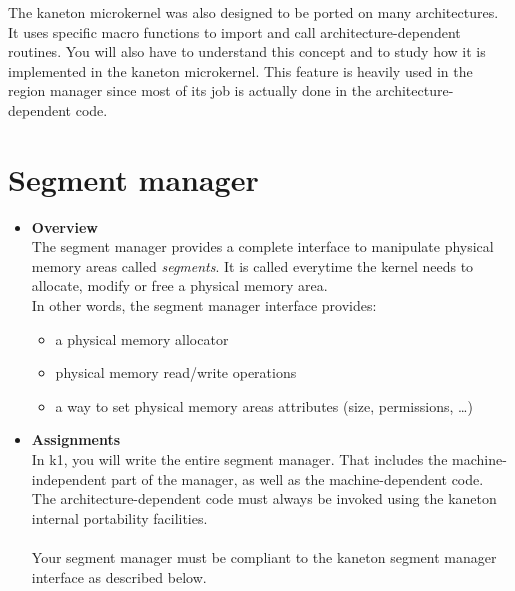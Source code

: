 The kaneton microkernel was also designed to be ported on many
architectures. It uses specific macro functions to import and call
architecture-dependent routines. You will also have
to understand this concept and to study how it is implemented in the
kaneton microkernel. This feature is heavily used in the region manager since
most of its job is actually done in the architecture-dependent code.

%
%

\newpage

\section{Segment manager}

\begin{itemize}
  \item {\bf Overview}\\
    The segment manager provides a complete interface to manipulate physical
    memory areas called {\em segments}. It is called everytime the kernel
    needs to allocate, modify or free a physical memory area.\\

    In other words, the segment manager interface provides:
    \begin{itemize}
    \item a physical memory allocator
    \item physical memory read/write operations
    \item a way to set physical memory areas attributes (size, permissions, \ldots)\\
      \end{itemize}

  \item {\bf Assignments}\\
    In k1, you will write the entire segment manager. That includes the
    machine-independent part of the manager, as well as the machine-dependent
    code.\\

    The architecture-dependent code must always be invoked using the kaneton
    internal portability facilities.\\
    \\
    Your segment manager must be compliant to the kaneton segment manager
    interface as described below.\\


\end{itemize}
